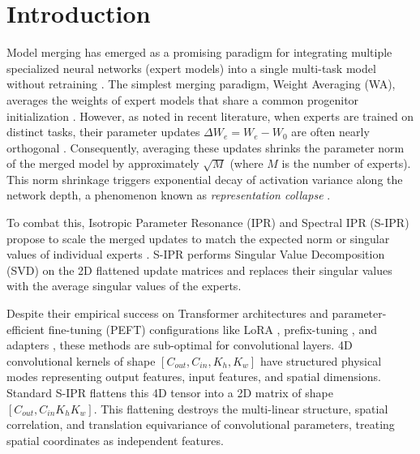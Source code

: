 \documentclass{article}
\theoremstyle{plain}
\theoremstyle{definition}
\theoremstyle{remark}
\begin{document}
\section{Introduction}
Model merging has emerged as a promising paradigm for integrating multiple specialized neural networks (expert models) into a single multi-task model without retraining \cite{wortsman2022model, mucke2023merging, caruana1997multitask}. The simplest merging paradigm, Weight Averaging (WA), averages the weights of expert models that share a common progenitor initialization \cite{wortsman2022model, mcmahan2017communication}. However, as noted in recent literature, when experts are trained on distinct tasks, their parameter updates $\Delta W_e = W_e - W_0$ are often nearly orthogonal \cite{ilharco2022editing, yadav2023resolving}. Consequently, averaging these updates shrinks the parameter norm of the merged model by approximately $\sqrt{M}$ (where $M$ is the number of experts). This norm shrinkage triggers exponential decay of activation variance along the network depth, a phenomenon known as \emph{representation collapse} \cite{jordan2023repair, wang2024rethinking}.

To combat this, Isotropic Parameter Resonance (IPR) and Spectral IPR (S-IPR) propose to scale the merged updates to match the expected norm or singular values of individual experts \cite{wortsman2022model, mucke2023merging}. S-IPR performs Singular Value Decomposition (SVD) on the 2D flattened update matrices and replaces their singular values with the average singular values of the experts. 

Despite their empirical success on Transformer architectures \cite{vaswani2017attention, devlin2018bert} and parameter-efficient fine-tuning (PEFT) configurations like LoRA \cite{hu2021lora}, prefix-tuning \cite{li2021prefix}, and adapters \cite{houlsby2019parameter}, these methods are sub-optimal for convolutional layers. 4D convolutional kernels of shape $[C_{out}, C_{in}, K_h, K_w]$ have structured physical modes representing output features, input features, and spatial dimensions. Standard S-IPR flattens this 4D tensor into a 2D matrix of shape $[C_{out}, C_{in} K_h K_w]$. This flattening destroys the multi-linear structure, spatial correlation, and translation equivariance of convolutional parameters, treating spatial coordinates as independent features.
\end{document}
